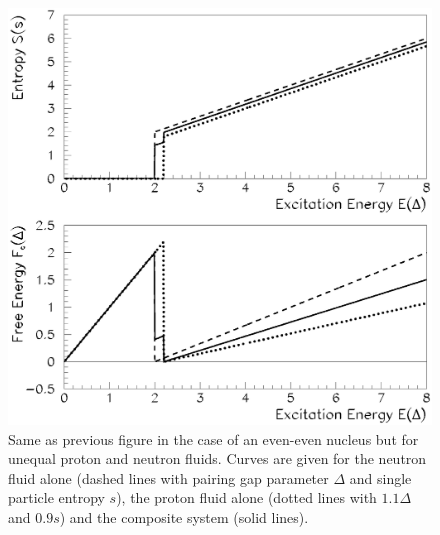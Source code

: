 \clearpage

\begin{figure}
\includegraphics[totalheight=20cm,angle=0,bb=0 20 350 730]{fig3.ps}
\caption{Same as previous figure in the case of an even-even nucleus but for 
unequal proton and neutron fluids. Curves are given for the neutron fluid alone
(dashed lines with pairing gap parameter $\Delta$ and single particle entropy 
$s$), the proton fluid alone (dotted lines with $1.1\Delta$ and $0.9s$) and the
composite system (solid lines).}
\label{fig:fig3}
\end{figure}

\clearpage

